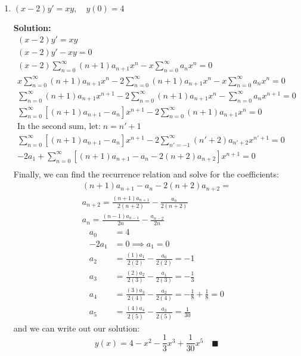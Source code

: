\documentclass[letterpaper, fontsize=11pt]{scrartcl} %
\numberwithin{equation}{section} %
\numberwithin{figure}{section} %
\numberwithin{table}{section} %
\begin{document}
\begin{enumerate}
\begin{enumerate}
\item $(x-2)y' = xy,\quad y(0) = 4$
\par \textbf{Solution:}
\begin{gather*}
(x-2)y' = xy\\
(x-2)y' - xy = 0\\
(x-2)\sum_{n=0}^\infty (n+1)a_{n+1}x^n - x \sum_{n=0}^\infty a_nx^n = 0\\
x\sum_{n=0}^\infty (n+1)a_{n+1}x^n-2\sum_{n=0}^\infty (n+1)a_{n+1}x^n - x \sum_{n=0}^\infty a_nx^n = 0\\
\sum_{n=0}^\infty (n+1)a_{n+1}x^{n+1}-2\sum_{n=0}^\infty (n+1)a_{n+1}x^n - \sum_{n=0}^\infty a_nx^{n+1} = 0\\
\sum_{n=0}^\infty \left[ (n+1)a_{n+1} -  a_n\right]x^{n+1} -2\sum_{n=0}^\infty (n+1)a_{n+1}x^n  = 0\\
\text{In the second sum, let:}\; n = n' + 1\\
\sum_{n=0}^\infty \left[ (n+1)a_{n+1} -  a_n\right]x^{n+1} -2\sum_{n'=-1}^\infty (n'+2)a_{n'+2}x^{n'+1}  = 0\\
-2 a_1 + \sum_{n=0}^\infty \left[ (n+1)a_{n+1} -  a_n -2 (n+2)a_{n+2}\right]x^{n+1} = 0\\
\end{gather*}
Finally, we can find the recurrence relation and solve for the coefficients:
\begin{gather*}
(n+1)a_{n+1} -  a_n -2 (n+2)a_{n+2} = \\
a_{n+2} = \frac{(n+1)a_{n+1}}{2(n+2)} - \frac{a_n}{2(n+2)} \\
a_{n} = \frac{(n-1)a_{n-1}}{2n} - \frac{a_{n-2}}{2n}
\end{gather*}
\begin{align*}
a_0 &= 4\\
-2a_1 &= 0 \implies a_1 = 0\\
a_{2} &= \frac{(1)a_{1}}{2(2)} - \frac{a_{0}}{2(2)} = -1\\
a_3 &= \frac{(2)a_{2}}{2(3)} - \frac{a_{1}}{2(3)} = -\frac{1}{3}\\
a_4 &= \frac{(3)a_{3}}{2(4)} - \frac{a_{2}}{2(4)} = -\frac{1}{8} +\frac{1}{8} = 0\\
a_5 &= \frac{(4)a_{4}}{2(5)} - \frac{a_{3}}{2(5)} = \frac{1}{30}
\end{align*}
and we can write out our solution:
\[
y(x) = 4 - x^2 - \frac{1}{3}x^3 + \frac{1}{30}x^5\quad\blacksquare
\]
\end{enumerate}



\end{enumerate}



\end{document}
